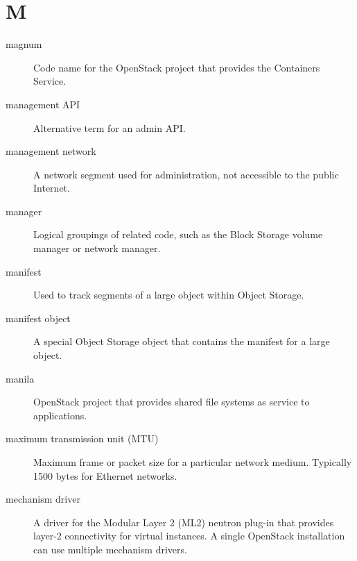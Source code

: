 \documentclass[letterpaper,10pt,english]{sphinxmanual}
\begin{document}
\section{M}
\label{_source/glossary:m}\begin{description}
\item[{magnum}] \leavevmode{}\label{_source/glossary:term-magnum}
Code name for the OpenStack project that provides the
Containers Service.

\item[{management API}] \leavevmode{}\label{_source/glossary:term-management-api}
Alternative term for an admin API.

\item[{management network}] \leavevmode{}\label{_source/glossary:term-management-network}
A network segment used for administration, not accessible to the
public Internet.

\item[{manager}] \leavevmode{}\label{_source/glossary:term-manager}
Logical groupings of related code, such as the Block Storage
volume manager or network manager.

\item[{manifest}] \leavevmode{}\label{_source/glossary:term-manifest}
Used to track segments of a large object within Object
Storage.

\item[{manifest object}] \leavevmode{}\label{_source/glossary:term-manifest-object}
A special Object Storage object that contains the manifest for a
large object.

\item[{manila}] \leavevmode{}\label{_source/glossary:term-manila}
OpenStack project that provides shared file systems as
service to applications.

\item[{maximum transmission unit (MTU)}] \leavevmode{}\label{_source/glossary:term-maximum-transmission-unit-mtu}
Maximum frame or packet size for a particular network
medium. Typically 1500 bytes for Ethernet networks.

\item[{mechanism driver}] \leavevmode{}\label{_source/glossary:term-mechanism-driver}
A driver for the Modular Layer 2 (ML2) neutron plug-in that
provides layer-2 connectivity for virtual instances. A
single OpenStack installation can use multiple mechanism
drivers.


\end{description}
\end{document}
